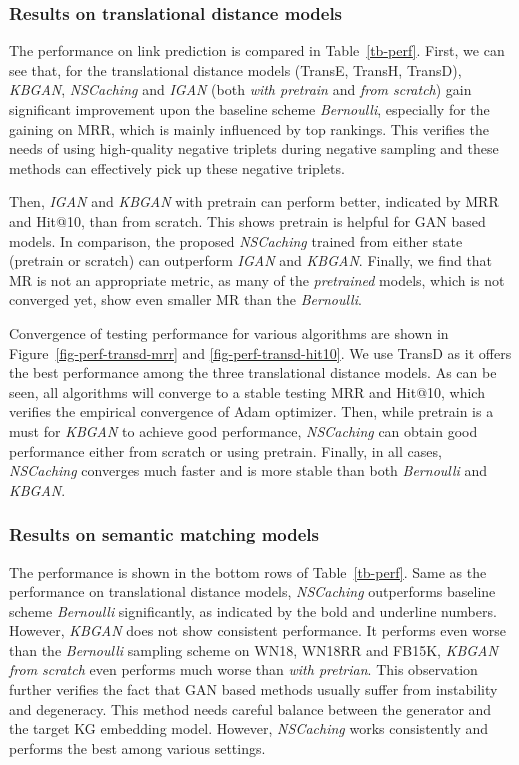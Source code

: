 \documentclass[conference]{IEEEtran}
\begin{document}
{
\subsubsection{Results on translational distance models}
The performance on link prediction is compared in Table~\ref{tb-perf}.
First, we can see that,
for the translational distance models (TransE, TransH, TransD), 
\textit{KBGAN}, \textit{NSCaching} and \textit{IGAN} (both \textit{with pretrain} and \textit{from scratch}) gain significant improvement upon the baseline scheme \textit{Bernoulli}, 
especially for the gaining on MRR, 
which is mainly influenced by top rankings.
This verifies the needs of using high-quality negative triplets during negative sampling and these methods can effectively pick up these negative triplets.

Then, \textit{IGAN} and \textit{KBGAN} with pretrain can perform better,
indicated by MRR and Hit@10,
than from scratch.
This shows pretrain is helpful for GAN based models. 
In comparison, the proposed \textit{NSCaching} trained from either state (pretrain or scratch)
can outperform \textit{IGAN} and \textit{KBGAN}.
Finally, we find that MR is not an appropriate metric, 
as many of the \textit{pretrained} models, which is not converged yet, 
show even smaller MR than the \textit{Bernoulli}.

Convergence of testing performance for various algorithms are shown in Figure~\ref{fig-perf-transd-mrr} and \ref{fig-perf-transd-hit10}.
We use TransD as it offers the best performance among the three translational distance models.
As can be seen, 
{
	all algorithms will converge to a stable testing MRR and Hit@10, which verifies the empirical convergence of Adam optimizer.
}
Then, while pretrain is a must for \textit{KBGAN} to achieve good performance,
\textit{NSCaching} can obtain good performance either from scratch or using pretrain.
Finally,
in all cases,
\textit{NSCaching} converges much faster and is more stable than both \textit{Bernoulli} and \textit{KBGAN}.

\subsubsection{Results on semantic matching models}
The performance is shown in the bottom rows of Table~\ref{tb-perf}. 
Same as the performance on translational distance models,
\textit{NSCaching} outperforms baseline scheme \textit{Bernoulli} significantly,
as indicated by the bold and underline numbers. 
However, \textit{KBGAN} does not show consistent performance.
It performs even worse than the \textit{Bernoulli} sampling scheme on WN18, WN18RR and FB15K,
\textit{KBGAN from scratch} even performs much worse than \textit{with pretrian}.
This observation further verifies the fact that GAN based methods usually suffer from instability and degeneracy.
This method needs careful balance between the generator and the target KG embedding model.
However, \textit{NSCaching} works consistently and performs the best among various settings.

}
\end{document}
